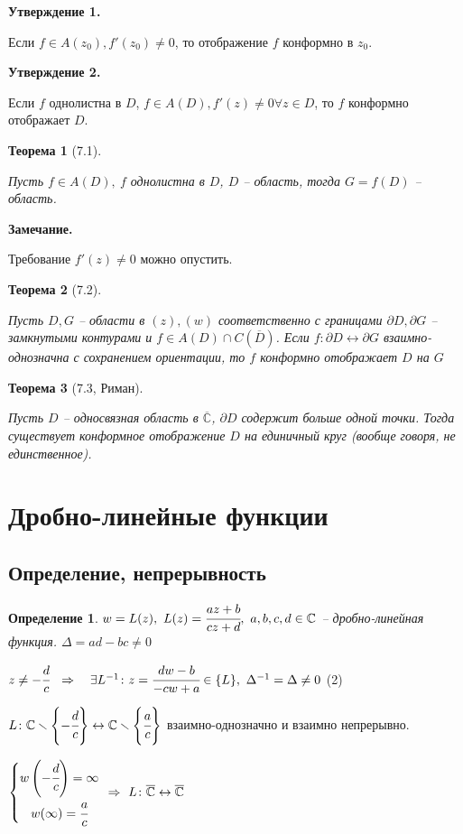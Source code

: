 \documentclass[draft]{article}
\newcommand{\forcenewline}{$\phantom{\mbox{newline}}$\newline}
\newcommand{\dd}{\partial}
\newcommand{\then}{\ \Rightarrow\ }
\renewcommand{\C}{\mathbb{C}}
\renewcommand{\bar}{\overline}
\newcommand{\D}{\Delta}
\newcommand{\E}{\ \exists}
\newcommand{\CC}{\bar{\C}}
\newcommand{\sys}[1]{\left\{\begin{matrix}#1\end{matrix}\right.}
\newcommand{\opr}[1]{\begin{opred}#1\end{opred}}
\newtheorem*{theor}{Теорема}
\newtheorem*{opred}{Определение}
\theoremstyle{remark}
\begin{document}
{\bfseries Утверждение 1.}

Если $f\in A(z_0), f'(z_0)\neq 0$, то отображение $f$ конформно в $z_0$.

{\bfseries Утверждение 2.}

Если $f$ однолистна в $D$, $f\in A(D), f'(z)\neq0 \forall z\in D$, то $f$ конформно отображает $D$.

\begin{theor}[7.1]
\forcenewline

Пусть $f\in A(D),\ f$ однолистна в $D$, $D$ -- область, тогда $G=f(D)$ -- область.
\end{theor}
{\bfseries Замечание.}

Требование $f'(z)\neq0$ можно опустить.
\begin{theor}[7.2]
\forcenewline

Пусть $D,G$ -- области в $(z), (w)$ соответственно с границами $\dd D, \dd G$ -- замкнутыми контурами и $f\in A(D)\cap C(\bar{D})$. Если $f\colon \dd D\leftrightarrow \dd G$ взаимно-однозначна с сохранением ориентации, то $f$ конформно отображает $D$ на $G$
\end{theor}
\begin{theor}[7.3, Риман]
\forcenewline

Пусть $D$ -- односвязная область в $\CC$, $\dd D$ содержит больше одной точки. Тогда существует конформное отображение $D$ на единичный круг (вообще говоря, не единственное).
\end{theor}

\newpage

\section{Дробно-линейные функции}

\subsection{Определение, непрерывность}

\opr{$w=L(z),\ L(z)=\cfrac{az+b}{cz+d},\ a,b,c,d\in \C$ -- дробно-линейная функция. $\D=ad-bc\neq0$}

$z\neq-\cfrac dc\ \then\ \E L^{-1}\colon z=\cfrac{dw-b}{-cw+a}\in\{L\},\ \D^{-1}=\D\neq0$ (2)

$L\colon \C\smallsetminus\left\{-\cfrac dc\right\}\leftrightarrow \C\smallsetminus\left\{\cfrac ac\right\}$ взаимно-однозначно и взаимно непрерывно.

$\sys{w\left(-\cfrac dc\right)=\infty \\ w(\infty)=\cfrac ac} \then L\colon \CC \leftrightarrow \CC$
\end{document}
